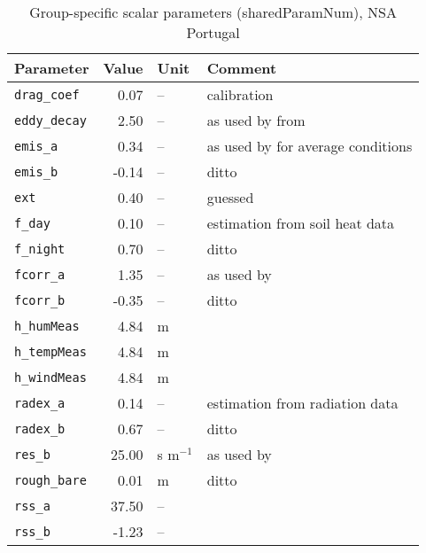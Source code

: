 \begin{table}[ht]
\centering
\caption{Group-specific scalar parameters (\textsf{sharedParamNum}), NSA Portugal} 
\label{tab:portugalNSA_sharedParamNum}
\begin{tabular}{lrll}
  \hline
Parameter & Value & Unit & Comment \\ 
  \hline
\verb!drag_coef! & 0.07 & -- & calibration \\ 
  \verb!eddy_decay! & 2.50 & -- & as used by \citet{shuttleworth85} from \citet{monteith73} \\ 
  \verb!emis_a! & 0.34 & -- & as used by \citet{maidment93} for average conditions \\ 
  \verb!emis_b! & -0.14 & -- & ditto \\ 
  \verb!ext! & 0.40 & -- & guessed \\ 
  \verb!f_day! & 0.10 & -- & estimation from soil heat data \\ 
  \verb!f_night! & 0.70 & -- & ditto \\ 
  \verb!fcorr_a! & 1.35 & -- & as used by \citet{maidment93} \\ 
  \verb!fcorr_b! & -0.35 & -- & ditto \\ 
  \verb!h_humMeas! & 4.84 & m &  \\ 
  \verb!h_tempMeas! & 4.84 & m &  \\ 
  \verb!h_windMeas! & 4.84 & m &  \\ 
  \verb!radex_a! & 0.14 & -- & estimation from radiation data \\ 
  \verb!radex_b! & 0.67 & -- & ditto \\ 
  \verb!res_b! & 25.00 & s m$^{-1}$ & as used by \citet{shuttleworth85} \\ 
  \verb!rough_bare! & 0.01 & m & ditto \\ 
  \verb!rss_a! & 37.50 & -- &  \\ 
  \verb!rss_b! & -1.23 & -- &  \\ 
   \hline
\end{tabular}
\end{table}
